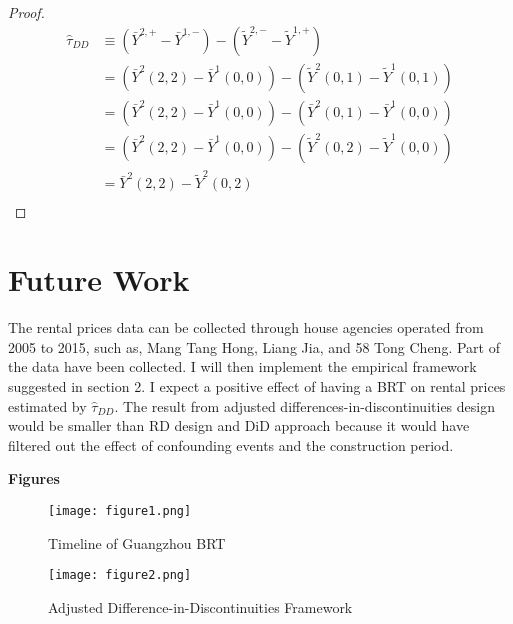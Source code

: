 \documentclass[12pt]{article}
\begin{document}
\begin{proof}
\begin{equation}
\begin{split}
    \hat{\tau}_{D D} &\equiv\left(\bar{Y}^{2,+}-\bar{Y}^{1,-}\right)-\left(\tilde{Y}^{2,-}-\tilde{Y}^{1,+}\right)
    \\
    &= \left(\bar{Y}^{2}(2,2)-\bar{Y}^{1}(0,0)\right) - \left(\tilde{Y}^{2}(0,1)-\tilde{Y}^{1}(0,1)\right)\\
    &= \left(\bar{Y}^{2}(2,2)-\bar{Y}^{1}(0,0)\right) - \left(\bar{Y}^{2}(0,1)-\bar{Y}^{1}(0,0)\right)\\
    &= \left(\bar{Y}^{2}(2,2)-\bar{Y}^{1}(0,0)\right) - \left(\tilde{Y}^{2}(0,2)-\tilde{Y}^{1}(0,0)\right)\\
    &= \bar{Y}^{2}(2,2)- \tilde{Y}^{2}(0,2)\\
\end{split}
\end{equation}
\end{proof}



\section{Future Work}
The rental prices data can be collected through house agencies operated from 2005 to 2015, such as, Mang Tang Hong, Liang Jia, and 58 Tong Cheng. Part of the data have been collected. I will then implement the empirical framework suggested in section 2. I expect a positive effect of having a BRT on rental prices estimated by $\hat{\tau}_{D D}$. The result from adjusted differences-in-discontinuities design would be smaller than RD design and DiD approach because it would have filtered out the effect of confounding events and the construction period. 



\clearpage

\textbf{Figures}

\begin{figure}[H]
\caption{Timeline of Guangzhou BRT}
\centering
\texttt{[image: figure1.png]}
\end{figure}

\begin{figure}[H]
\caption{Adjusted Difference-in-Discontinuities Framework}
\centering
\texttt{[image: figure2.png]}
\end{figure}
\end{document}
